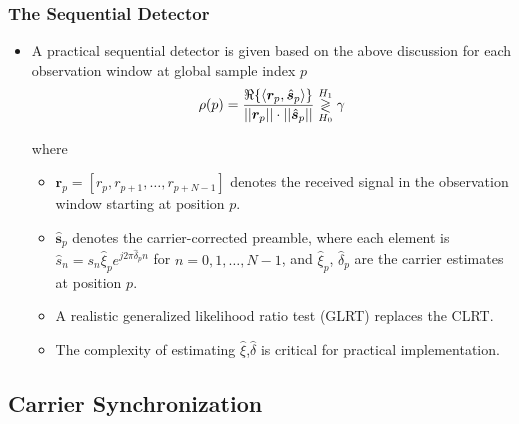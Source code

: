 \begin{frame}
  \frametitle{The Sequential Detector}
    \begin{itemize}
    
        \item A practical sequential detector is given based on the above discussion for each observation window at global sample index $p$
        \begin{equation}
          \label{eq:generalized_corr}
          \rho(p)=
          \frac{\Re\{\langle
            \boldsymbol{r}_{p},\hat{\boldsymbol{s}}_{p}\rangle\}}
          {||\boldsymbol{r}_{p}||\cdot||\hat{\boldsymbol{s}}_{p}||} \mathrel{\mathop\gtrless\limits^{H_1}_{H_0}} \gamma
        \end{equation}

        where 
        \begin{itemize}
          \item $\bm{r}_{p}{=}[r_{p},r_{p+1},\ldots,r_{p+N-1}]$ denotes the received signal in the observation window
          starting at position $p$.
          \item $\hat{\bm{s}}_{p}$ denotes the carrier-corrected preamble,
          where each element is $\hat{s}_{n}=s_n\hat{\xi}_{p}e^{j2\pi\hat{\delta}_{p}n}$
          for $n=0,1,\ldots,N{-}1$, and $\hat{\xi}_{p}$, $\hat{\delta}_{p}$ are the carrier estimates at
          position $p$.
          \item A realistic generalized likelihood ratio test (GLRT) replaces the CLRT.
          \item The complexity of estimating $\hat{\xi}$,$\hat{\delta}$ is critical for practical implementation. 

        \end{itemize}
        
        
    \end{itemize}

\end{frame}

\subsection{Carrier Synchronization}

